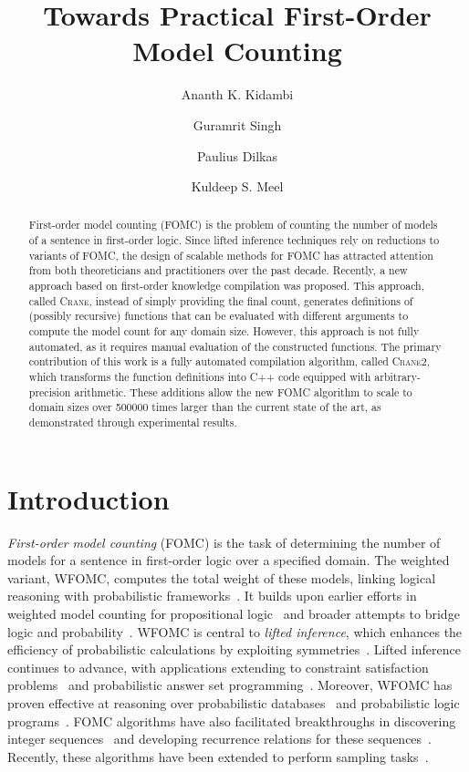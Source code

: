 \documentclass[a4paper,UKenglish,cleveref,autoref]{lipics-v2021}
\title{Towards Practical First-Order Model Counting}
\author{Ananth K. Kidambi}{Indian Institute of Technology Bombay, Mumbai, India}{210051002@iitb.ac.in}{}{}
\author{Guramrit Singh}{Indian Institute of Technology Bombay, Mumbai, India}{guramrit@iitb.ac.in}{}{}
\author{Paulius Dilkas}{University of Toronto, Toronto, Canada \and Vector Institute, Toronto, Canada \and \url{https://dilkas.github.io/}}{paulius.dilkas@utoronto.ca}{https://orcid.org/0000-0001-9185-7840}{}
\author{Kuldeep S. Meel}{Georgia Institute of Technology, Atlanta, GA, USA \and University of Toronto, Toronto, Canada \and \url{https://www.cs.toronto.edu/~meel/}}{meel@cs.toronto.edu}{https://orcid.org/0000-0001-9423-5270}{}
\newcommand{\Cranetwo}{\textsc{Crane2}}
\begin{document}
\maketitle

\begin{abstract}
  First-order model counting (FOMC) is the problem of counting the number of
  models of a sentence in first-order logic. Since lifted inference techniques
  rely on reductions to variants of FOMC, the design of scalable methods for
  FOMC has attracted attention from both theoreticians and practitioners over
  the past decade. Recently, a new approach based on first-order knowledge
  compilation was proposed. This approach, called \textsc{Crane}, instead of
  simply providing the final count, generates definitions of (possibly
  recursive) functions that can be evaluated with different arguments to compute
  the model count for any domain size. However, this approach is not fully
  automated, as it requires manual evaluation of the constructed functions. The
  primary contribution of this work is a fully automated compilation algorithm,
  called \Cranetwo{}, which transforms the function definitions into C++ code
  equipped with arbitrary-precision arithmetic. These additions allow the new
  FOMC algorithm to scale to domain sizes over \num{500000} times larger than
  the current state of the art, as demonstrated through experimental results.
\end{abstract}

\section{Introduction}

\emph{First-order model counting} (FOMC) is the task of determining the number
of models for a sentence in first-order logic over a specified domain. The
weighted variant, WFOMC, computes the total weight of these models, linking
logical reasoning with probabilistic
frameworks~\cite{DBLP:conf/ijcai/BroeckTMDR11}. It builds upon earlier efforts
in weighted model counting for propositional
logic~\cite{DBLP:journals/ai/ChaviraD08} and broader attempts to bridge logic
and
probability~\cite{DBLP:journals/ai/Nilsson86,novak2012mathematical,vsaletic2024graded}.
WFOMC is central to \emph{lifted inference}, which enhances the efficiency of
probabilistic calculations by exploiting
symmetries~\cite{DBLP:conf/ecai/Kersting12}. Lifted inference continues to
advance, with applications extending to constraint satisfaction
problems~\cite{DBLP:journals/jair/TotisDRK23} and probabilistic answer set
programming~\cite{DBLP:journals/ijar/AzzoliniR23}. Moreover, WFOMC has proven
effective at reasoning over probabilistic
databases~\cite{DBLP:journals/debu/GribkoffSB14} and probabilistic logic
programs~\cite{DBLP:journals/ijar/RiguzziBZCL17}. FOMC algorithms have also
facilitated breakthroughs in discovering integer
sequences~\cite{DBLP:conf/ijcai/SvatosJT0K23} and developing recurrence
relations for these sequences~\cite{DBLP:conf/kr/DilkasB23}. Recently, these
algorithms have been extended to perform sampling
tasks~\cite{DBLP:journals/ai/WangPWK24}.
\end{document}
